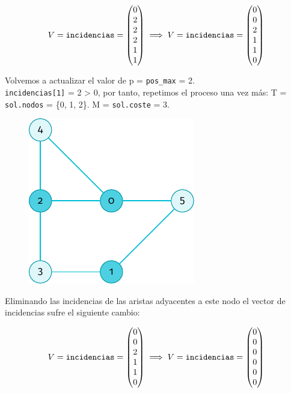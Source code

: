 \documentclass[11pt]{article}
\begin{document}
$$ V = \verb|incidencias| = 
\begin{pmatrix}
	0 \\
	2 \\
	2 \\
	2 \\
	1 \\
	1 
\end{pmatrix} \implies V = \verb|incidencias| = 
\begin{pmatrix}
	0 \\
	0 \\
	2 \\
	1 \\
	1 \\
	0 
\end{pmatrix}$$

Volvemos a actualizar el valor de p = \verb|pos_max| = 2.\\
\verb|incidencias[1]| = 2 > 0, por tanto, repetimos el proceso una vez más: T  = \verb|sol.nodos| = \{0, 1, 2\}. 
M = \verb|sol.coste| = 3.

\begin{figure}[H]
	\centering \includegraphics{./img/grafo-ejemplo.pdf}
\end{figure}

Eliminando las incidencias de las aristas adyacentes a este nodo el vector de incidencias sufre el siguiente cambio:

 $$ V = \verb|incidencias| = 
\begin{pmatrix}
	0 \\
	0 \\
	2 \\
	1 \\
	1 \\
	0  
\end{pmatrix} \implies V = \verb|incidencias| = 
\begin{pmatrix}
	0 \\
	0 \\
	0 \\
	0 \\
	0 \\
	0 
\end{pmatrix}$$
\end{document}
